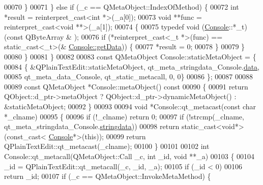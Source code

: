 \begin{DoxyCode}
00070         \}
00071     \} \textcolor{keywordflow}{else} \textcolor{keywordflow}{if} (\_c == QMetaObject::IndexOfMethod) \{
00072         \textcolor{keywordtype}{int} *result = \textcolor{keyword}{reinterpret\_cast<}\textcolor{keywordtype}{int} *\textcolor{keyword}{>}(\_a[0]);
00073         \textcolor{keywordtype}{void} **func = \textcolor{keyword}{reinterpret\_cast<}\textcolor{keywordtype}{void} **\textcolor{keyword}{>}(\_a[1]);
00074         \{
00075             \textcolor{keyword}{typedef} void (\hyperlink{a00005}{Console}::*\_t)(\textcolor{keyword}{const} QByteArray & );
00076             \textcolor{keywordflow}{if} (*reinterpret\_cast<\_t *>(func) == \textcolor{keyword}{static\_cast<}\_t\textcolor{keyword}{>}(&
      \hyperlink{a00005_a1976aad46ce1a77be730bc628275038f}{Console::getData})) \{
00077                 *result = 0;
00078             \}
00079         \}
00080     \}
00081 \}
00082 
00083 \textcolor{keyword}{const} QMetaObject Console::staticMetaObject = \{
00084     \{ &QPlainTextEdit::staticMetaObject, qt\_meta\_stringdata\_Console.\hyperlink{a00064_af7131d57b034ad13a178d273cfee74c2}{data},
00085       qt\_meta\_data\_Console,  qt\_static\_metacall, 0, 0\}
00086 \};
00087 
00088 
00089 \textcolor{keyword}{const} QMetaObject *Console::metaObject()\textcolor{keyword}{ const}
00090 \textcolor{keyword}{}\{
00091     \textcolor{keywordflow}{return} QObject::d\_ptr->metaObject ? QObject::d\_ptr->dynamicMetaObject() : &staticMetaObject;
00092 \}
00093 
00094 \textcolor{keywordtype}{void} *Console::qt\_metacast(\textcolor{keyword}{const} \textcolor{keywordtype}{char} *\_clname)
00095 \{
00096     \textcolor{keywordflow}{if} (!\_clname) \textcolor{keywordflow}{return} 0;
00097     \textcolor{keywordflow}{if} (!strcmp(\_clname, qt\_meta\_stringdata\_Console.\hyperlink{a00064_a63ab346e732e08dad62cdef78b05d53d}{stringdata}))
00098         \textcolor{keywordflow}{return} \textcolor{keyword}{static\_cast<}\textcolor{keywordtype}{void}*\textcolor{keyword}{>}(\textcolor{keyword}{const\_cast<} \hyperlink{a00005}{Console}*\textcolor{keyword}{>}(\textcolor{keyword}{this}));
00099     \textcolor{keywordflow}{return} QPlainTextEdit::qt\_metacast(\_clname);
00100 \}
00101 
00102 \textcolor{keywordtype}{int} Console::qt\_metacall(QMetaObject::Call \_c, \textcolor{keywordtype}{int} \_id, \textcolor{keywordtype}{void} **\_a)
00103 \{
00104     \_id = QPlainTextEdit::qt\_metacall(\_c, \_id, \_a);
00105     \textcolor{keywordflow}{if} (\_id < 0)
00106         \textcolor{keywordflow}{return} \_id;
00107     \textcolor{keywordflow}{if} (\_c == QMetaObject::InvokeMetaMethod) \{

\end{DoxyCode}
